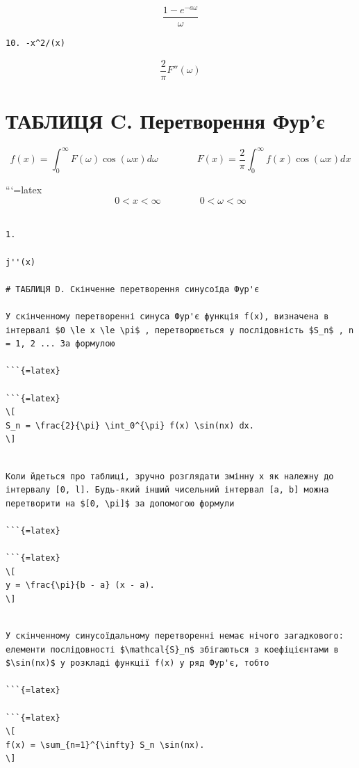 \documentclass[
]{article}
\begin{document}
\[
\frac{1-e^{-a\omega}}{\omega}
\]

\begin{verbatim}
10. -x^2/(x)
\end{verbatim}

\[
\frac{2}{\pi}F''(\omega)
\]

\section{ТАБЛИЦЯ C. Перетворення
Фур'є}\label{ux442ux430ux431ux43bux438ux446ux44f-c.-ux43fux435ux440ux435ux442ux432ux43eux440ux435ux43dux43dux44f-ux444ux443ux440ux454}

\[
f(x) = \int_{0}^{\infty} F(\omega) \cos(\omega x) d\omega \qquad \qquad F(x) = \frac{2}{\pi} \int_{0}^{\infty} f(x) \cos(\omega x) dx
\]

```{=latex}
\[
0 < x < \infty \qquad \qquad 0 < \omega < \infty
\]

\begin{verbatim}

1.

j''(x)

# ТАБЛИЦЯ D. Скінченне перетворення синусоїда Фур'є

У скінченному перетворенні синуса Фур'є функція f(x), визначена в інтервалі $0 \le x \le \pi$ , перетворюється у послідовність $S_n$ , n = 1, 2 ... За формулою

```{=latex}

```{=latex}
\[
S_n = \frac{2}{\pi} \int_0^{\pi} f(x) \sin(nx) dx.
\]
\end{verbatim}

\begin{verbatim}

Коли йдеться про таблиці, зручно розглядати змінну x як належну до інтервалу [0, l]. Будь-який інший чисельний інтервал [a, b] можна перетворити на $[0, \pi]$ за допомогою формули

```{=latex}

```{=latex}
\[
y = \frac{\pi}{b - a} (x - a).
\]
\end{verbatim}

\begin{verbatim}

У скінченному синусоїдальному перетворенні немає нічого загадкового: елементи послідовності $\mathcal{S}_n$ збігаються з коефіцієнтами в $\sin(nx)$ у розкладі функції f(x) у ряд Фур'є, тобто

```{=latex}

```{=latex}
\[
f(x) = \sum_{n=1}^{\infty} S_n \sin(nx).
\]
\end{verbatim}
\end{document}
